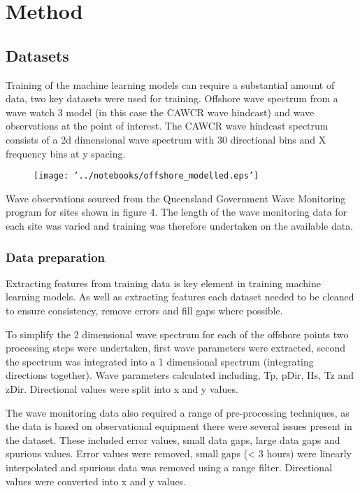 \documentclass[a4paper,fleqn]{cas-sc}
\begin{document}
\subsection{}



\section{Method}\label{method}

\subsection{Datasets}
Training of the machine learning models can require a substantial amount of data, two key datasets were used for training. Offshore wave spectrum from a wave watch 3 model (in this case the CAWCR wave hindcast) and wave observations at the point of interest. The CAWCR wave hindcast spectrum consists of a 2d dimensional wave spectrum with 30 directional bins and X frequency bins at y spacing.

\begin{figure}[<options>]
	\centering
		\texttt{[image: '../notebooks/offshore\_modelled.eps']}
	  \caption{}\label{fig1}
\end{figure}

Wave observations sourced from the Queensland Government Wave Monitoring program for sites shown in figure 4. The length of the wave monitoring data for each site was varied and training was therefore undertaken on the available data.

\subsubsection{Data preparation}
Extracting features from training data is key element in training machine learning models. As well as extracting features each dataset needed to be cleaned to ensure consistency, remove errors and fill gaps where possible. 

To simplify the 2 dimensional wave spectrum for each of the offshore points two processing steps were undertaken, first wave parameters were extracted, second the spectrum was integrated into a 1 dimensional spectrum (integrating directions together). Wave parameters calculated including, Tp, pDir, Hs, Tz and zDir. Directional values were split into x and y values.

The wave monitoring data also required a range of pre-processing techniques, as the data is based on observational equipment there were several issues present in the dataset. These included error values, small data gaps, large data gaps and spurious values. Error values were removed, small gaps (< 3 hours) were linearly interpolated and spurious data was removed using a range filter. Directional values were converted into x and y values. 
\end{document}
